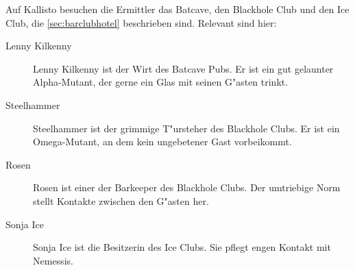 
Auf Kallisto besuchen die Ermittler das Batcave, den Blackhole Club und den Ice Club, die \cref{sec:barclubhotel} beschrieben sind. Relevant sind hier:

\begin{description}
    \item [Lenny Kilkenny] Lenny Kilkenny ist der Wirt des Batcave Pubs. Er ist ein gut gelaunter Alpha-Mutant, der gerne ein Glas mit 
        seinen G"asten trinkt.
    \item [Steelhammer] Steelhammer ist der grimmige T"ursteher des Blackhole Clubs. Er ist ein Omega-Mutant, an dem kein ungebetener Gast 
        vorbeikommt.
    \item [Rosen]  Rosen ist einer der Barkeeper des Blackhole Clubs. Der umtriebige Norm stellt Kontakte zwischen den G"asten her. 
    \item [Sonja Ice] Sonja Ice ist die Besitzerin des Ice Clubs. Sie pflegt engen Kontakt mit Nemessis. 
\end{description}
